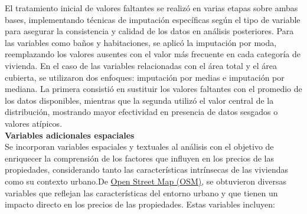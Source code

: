 \documentclass[a4paper]{article}
\theoremstyle{remark}
\theoremstyle{definition}
\begin{document}
El tratamiento inicial de valores faltantes se realizó en varias etapas sobre ambas bases, implementando técnicas de imputación específicas según el tipo de variable  para asegurar la consistencia y calidad de los datos en análisis posteriores. Para las variables como baños y habitaciones, se aplicó la imputación por moda, reemplazando los valores ausentes con el valor más frecuente en cada categoría de vivienda. En el caso de las variables relacionadas con el área total y el área cubierta, se utilizaron dos enfoques: imputación por medias e imputación por mediana. La primera consistió en sustituir los valores faltantes con el promedio de los datos disponibles, mientras que la segunda utilizó el valor central de la distribución, mostrando mayor efectividad en presencia de datos sesgados o valores atípicos.\\

\textbf{Variables adicionales espaciales} \\

Se incorporan variables espaciales y textuales al análisis con el objetivo de enriquecer la comprensión de los factores que influyen en los precios de las propiedades, considerando tanto las características intrínsecas de las viviendas como su contexto urbano.De \href{https://www.openstreetmap.org/#map=6/4.63/-74.30}{Open Street Map (OSM)}, se obtuvieron diversas variables que reflejan las características del entorno urbano y que tienen un impacto directo en los precios de las propiedades. Estas variables incluyen:\\
\end{document}
